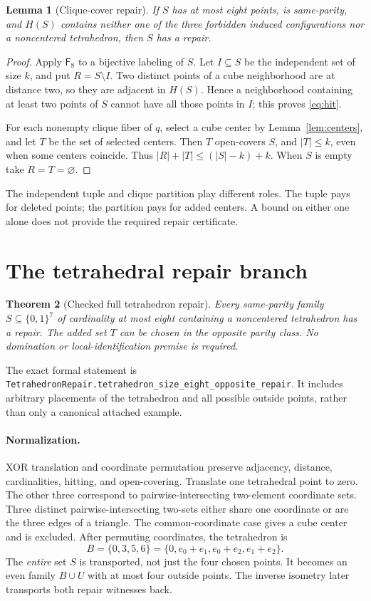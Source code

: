 \documentclass[11pt]{article}
\newtheorem{theorem}{Theorem}[section]
\newtheorem{lemma}[theorem]{Lemma}
\theoremstyle{definition}\newtheorem{definition}[theorem]{Definition}
\theoremstyle{remark}\newtheorem{remark}[theorem]{Remark}
\newcommand{\card}[1]{\lvert #1\rvert}
\newcommand{\src}[1]{{\small\nolinkurl{#1}}}
\newcommand{\F}{\mathsf{F}_{8}}
\newcommand{\bits}{\{0,1\}}
\begin{document}
\begin{lemma}[Clique-cover repair]\label{lem:cliquerepair}
If $S$ has at most eight points, is same-parity, and $H(S)$ contains neither one of the three forbidden induced configurations nor a noncentered tetrahedron, then $S$ has a repair.
\end{lemma}
\begin{proof}
Apply $\F$ to a bijective labeling of $S$. Let $I\subseteq S$ be the independent set of size $k$, and put $R=S\setminus I$. Two distinct points of a cube neighborhood are at distance two, so they are adjacent in $H(S)$. Hence a neighborhood containing at least two points of $S$ cannot have all those points in $I$; this proves \eqref{eq:hit}.

For each nonempty clique fiber of $q$, select a cube center by Lemma~\ref{lem:centers}, and let $T$ be the set of selected centers. Then $T$ open-covers $S$, and $\card T\le k$, even when some centers coincide. Thus $\card R+\card T\le(\card S-k)+k$. When $S$ is empty take $R=T=\varnothing$.
\end{proof}
The independent tuple and clique partition play different roles. The tuple pays for deleted points; the partition pays for added centers. A bound on either one alone does not provide the required repair certificate.

\section{The tetrahedral repair branch}
\begin{theorem}[Checked full tetrahedron repair]\label{thm:tetra}
Every same-parity family $S\subseteq\bits^7$ of cardinality at most eight containing a noncentered tetrahedron has a repair. The added set $T$ can be chosen in the opposite parity class. No domination or local-identification premise is required.
\end{theorem}
The exact formal statement is \src{TetrahedronRepair.tetrahedron_size_eight_opposite_repair}. It includes arbitrary placements of the tetrahedron and all possible outside points, rather than only a canonical attached example.

\paragraph{Normalization.}
XOR translation and coordinate permutation preserve adjacency, distance, cardinalities, hitting, and open-covering. Translate one tetrahedral point to zero. The other three correspond to pairwise-intersecting two-element coordinate sets. Three distinct pairwise-intersecting two-sets either share one coordinate or are the three edges of a triangle. The common-coordinate case gives a cube center and is excluded. After permuting coordinates, the tetrahedron is
\[
 B=\{0,3,5,6\}=\{0,e_0+e_1,e_0+e_2,e_1+e_2\}.
\]
The \emph{entire} set $S$ is transported, not just the four chosen points. It becomes an even family $B\cup U$ with at most four outside points. The inverse isometry later transports both repair witnesses back.
\end{document}
